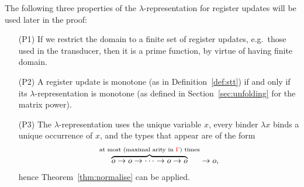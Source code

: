 The following  three properties of the $\lambda$-representation for register updates will be used later in the proof:
\begin{enumerate}
\item[(P1)]  If we restrict the domain to a finite set of register updates, e.g.~those used in the transducer, then it is a prime function, by virtue of having finite domain.
\item[(P2)] A register update is monotone  (as in Definition~\ref{def:stt})  if and only if its $\lambda$-representation is monotone (as defined in    Section~\ref{sec:unfolding} for the matrix power).
\item[(P3)] The $\lambda$-representation uses the unique variable $x$, every binder $\lambda x$ binds a unique occurrence of $x$, and the types that appear are of the form 
\begin{align*}
\overbrace{o \to o \to \cdots \to o \to o}^{\text{at most (maximal arity in ${\color{red}{\Gamma}}$) times}} \to o,
\end{align*}
hence Theorem~\ref{thm:normalise} can be applied. 
\end{enumerate}

 
%
    
